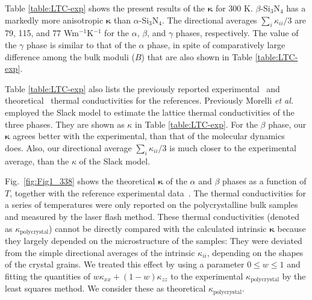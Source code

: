 \documentclass[twocolumn,amsmath,amssymb,a4paper,prb,superscriptaddress,floatfix]{revtex4-1}
\begin{document}
Table \ref{table:LTC-exp} shows the present results of the
$\boldsymbol{\kappa}$ for 300 K.  $\beta$-Si$_3$N$_4$ has a markedly more
anisotropic $\boldsymbol{\kappa}$ than $\alpha$-Si$_3$N$_4$.  The directional
averages $\sum_i \kappa_{ii}/3$  are 79, 115,  and 77 Wm$^{-1}$K$^{-1}$ for the
$\alpha$, $\beta$, and $\gamma$ phases, respectively.  The value of the
$\gamma$ phase is similar to that of the $\alpha$ phase, in spite of
comparatively large difference among the bulk moduli ($B$) that are also shown
in Table \ref{table:LTC-exp}.   

Table \ref{table:LTC-exp} also lists the previously reported
experimental~\cite{li} and theoretical~\cite{hirosaki-md} thermal
conductivities for the references.  Previously Morelli {\it et
al.}~\cite{morelli} employed the Slack model to estimate the lattice thermal
conductivities of the three phases. They are shown as $\kappa$ in Table
\ref{table:LTC-exp}. For the $\beta$ phase, our $\boldsymbol{\kappa}$ agrees
better with the experimental, than that of the molecular
dynamics~\cite{hirosaki-md} does.  Also, our directional average $\sum_i
\kappa_{ii}/3$ is much closer to the experimental
average, than the $\kappa$ of the Slack model.

Fig.~\ref{fig:Fig1_338} shows the theoretical $\boldsymbol{\kappa}$ of the
$\alpha$ and $\beta$ phases as a function of $T$, together with the reference
experimental data~\cite{hirosaki,hirai}. The thermal conductivities for a series
of temperatures were only reported on the polycrystalline bulk samples and
measured by the laser flash method.  These thermal conductivities (denoted as
$\kappa_\mathrm{polycrystal}$) cannot be directly compared with the calculated
intrinsic $\boldsymbol{\kappa}$ because they largely depended on the
microstructure of the samples: They were deviated from the simple directional
averages of the intrinsic $\kappa_{ii}$, depending on the shapes of the crystal
grains.  We treated this effect by using a parameter $0\le{w}\le{1}$ and fitting
the quantities of $w\kappa_{xx} + (1-w) \kappa_{zz}$ to the experimental
$\kappa_\mathrm{polycrystal}$ by the least squares method. We consider these as
theoretical $\kappa_\mathrm{polycrystal}$. 
\end{document}
